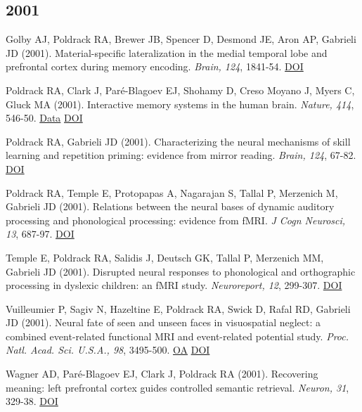 \subsection*{2001}

Golby AJ, Poldrack RA, Brewer JB, Spencer D, Desmond JE, Aron AP, Gabrieli JD (2001). Material-specific lateralization in the medial temporal lobe and prefrontal cortex during memory encoding. \textit{Brain, 124}, 1841-54. \href{http://dx.doi.org/10.1093/brain/124.9.1841}{DOI} \vspace{2mm}

Poldrack RA, Clark J, Paré-Blagoev EJ, Shohamy D, Creso Moyano J, Myers C, Gluck MA (2001). Interactive memory systems in the human brain. \textit{Nature, 414}, 546-50. \href{https://openneuro.org/datasets/ds000052/versions/00001}{Data} \href{http://dx.doi.org/10.1038/35107080}{DOI} \vspace{2mm}

Poldrack RA, Gabrieli JD (2001). Characterizing the neural mechanisms of skill learning and repetition priming: evidence from mirror reading. \textit{Brain, 124}, 67-82. \href{http://dx.doi.org/10.1093/brain/124.1.67}{DOI} \vspace{2mm}

Poldrack RA, Temple E, Protopapas A, Nagarajan S, Tallal P, Merzenich M, Gabrieli JD (2001). Relations between the neural bases of dynamic auditory processing and phonological processing: evidence from fMRI. \textit{J Cogn Neurosci, 13}, 687-97. \href{http://dx.doi.org/10.1162/089892901750363235}{DOI} \vspace{2mm}

Temple E, Poldrack RA, Salidis J, Deutsch GK, Tallal P, Merzenich MM, Gabrieli JD (2001). Disrupted neural responses to phonological and orthographic processing in dyslexic children: an fMRI study. \textit{Neuroreport, 12}, 299-307. \href{http://dx.doi.org/10.1097/00001756-200102120-00024}{DOI} \vspace{2mm}

Vuilleumier P, Sagiv N, Hazeltine E, Poldrack RA, Swick D, Rafal RD, Gabrieli JD (2001). Neural fate of seen and unseen faces in visuospatial neglect: a combined event-related functional MRI and event-related potential study. \textit{Proc. Natl. Acad. Sci. U.S.A., 98}, 3495-500. \href{https://www.ncbi.nlm.nih.gov/pmc/articles/PMC30681}{OA} \href{http://dx.doi.org/10.1073/pnas.051436898}{DOI} \vspace{2mm}

Wagner AD, Paré-Blagoev EJ, Clark J, Poldrack RA (2001). Recovering meaning: left prefrontal cortex guides controlled semantic retrieval. \textit{Neuron, 31}, 329-38. \href{http://dx.doi.org/10.1016/s0896-6273(01)00359-2}{DOI} \vspace{2mm}

